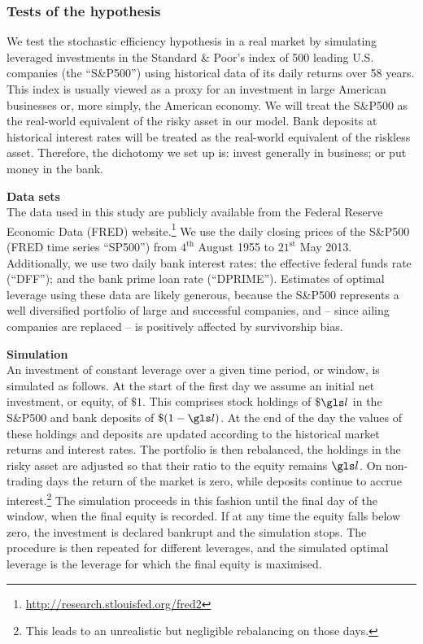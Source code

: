 \subsubsection{Tests of the hypothesis}
We test the stochastic efficiency hypothesis in a real market by simulating leveraged investments in the Standard \& Poor's index of 500 leading U.S. companies (the ``S\&P500'') using historical data of its daily returns over 58 years. This index is usually viewed as a proxy for an investment in large American businesses or, more simply, the American economy. We will treat the S\&P500 as the real-world equivalent of the risky asset in our model. Bank deposits at historical interest rates will be treated as the real-world equivalent of the riskless asset. Therefore, the dichotomy we set up is: invest generally in business; or put money in the bank.

\textbf{Data sets}\\
The data used in this study are publicly available from the Federal Reserve Economic Data (FRED) website.\footnote{\url{http://research.stlouisfed.org/fred2}} We use the daily closing prices of the S\&P500 (FRED time series ``SP500'') from $4^{\text{th}}$ August 1955 to $21^{\text{st}}$ May 2013. Additionally, we use two daily bank interest rates: the effective federal funds rate (``DFF''); and the bank prime loan rate (``DPRIME''). Estimates of optimal leverage using these data are likely generous, because the S\&P500 represents a well diversified portfolio of large and successful companies, and -- since ailing companies are replaced -- is positively affected by survivorship bias.

\textbf{Simulation}\\
An investment of constant leverage over a given time period, or window, is simulated as follows. At the start of the first day we assume an initial net investment, or equity, of $\$1$. This comprises stock holdings of $\$\l$ in the S\&P500 and bank deposits of $\$(1-\l)$. At the end of the day the values of these holdings and deposits are updated according to the historical market returns and interest rates. The portfolio is then rebalanced, \ie the holdings in the risky asset are adjusted so that their ratio to the equity remains $\l$. On non-trading days the return of the market is zero, while deposits continue to accrue interest.\footnote{This leads to an unrealistic but negligible rebalancing on those days.} The simulation proceeds in this fashion until the final day of the window, when the final equity is recorded. If at any time the equity falls below zero, the investment is declared bankrupt and the simulation stops.  The procedure is then repeated for different leverages, and the simulated optimal leverage is the leverage for which the final equity is maximised.

